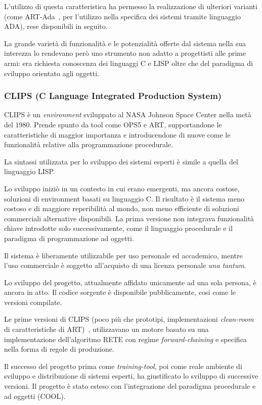 L'utilizzo di questa caratteristica ha permesso la realizzazione di ulteriori varianti (come ART-Ada~\cite{artadanasa1990}, per l'utilizzo nella specifica dei sistemi tramite linguaggio ADA), rese disponibili in seguito.

La grande varietà di funzionalità e le potenzialità offerte dal sistema nella sua interezza lo rendevano però uno strumento non adatto a progettisti alle prime armi: era richiesta conoscenza dei linguaggi C e LISP oltre che del paradigma di sviluppo orientato agli oggetti.~\cite{development1993}

\subsubsection[CLIPS]{CLIPS (C Language Integrated Production System)}

CLIPS è un \emph{environment} sviluppato al NASA Johnson Space Center nella metà del 1980. Prende spunto da tool come OPS5 e ART, supportandone le caratteristiche di maggior importanza e introducendone di nuove come le funzionalità relative alla programmazione procedurale. 

La sintassi utilizzata per lo sviluppo dei sistemi esperti è simile a quella del linguaggio LISP. 

Lo sviluppo iniziò in un contesto in cui erano emergenti, ma ancora costose, soluzioni di environment basati su linguaggio C. Il risultato è il sistema meno costoso e di maggiore reperibilità al mondo, non meno efficiente di soluzioni commerciali alternative disponibili. La prima versione non integrava funzionalità chiave introdotte solo successivamente, come il linguaggio procedurale e il paradigma di programmazione ad oggetti.~\cite{jackson1999}

Il sistema è liberamente utilizzabile per uso personale ed accademico, mentre l'uso commerciale è soggetto all'acquisto di una licenza personale \emph{una tantum}.

Lo sviluppo del progetto, attualmente affidato unicamente ad una sola persona, è ancora in atto. Il codice sorgente è disponibile pubblicamente, cosi come le versioni compilate.

Le prime versioni di CLIPS (poco più che prototipi, implementazioni \emph{clean-room} di caratteristiche di ART)~\cite{clipsarch1992}, utilizzavano un motore basato su una implementazione dell'algoritmo RETE con regime \emph{forward-chaining} e specifica nella forma di regole di produzione. 

Il successo del progetto prima come \emph{training-tool}, poi come reale ambiente di sviluppo e distribuzione di sistemi esperti, ha giustificato lo sviluppo di successive versioni. Il progetto è stato esteso con l'integrazione del paradigma procedurale e ad oggetti (COOL).

